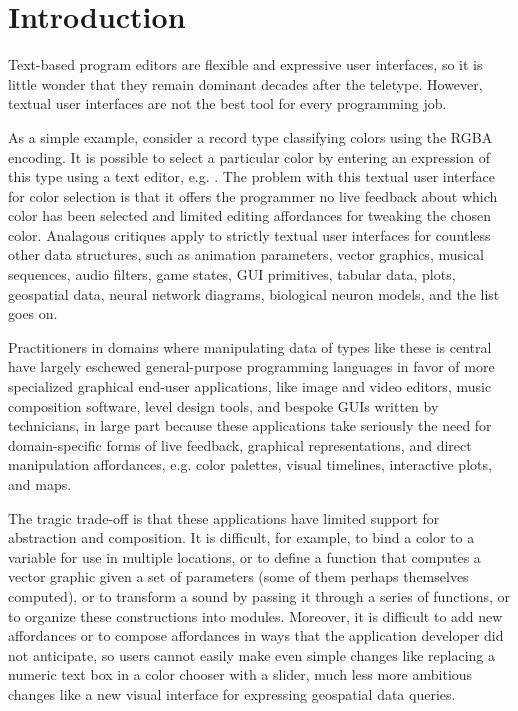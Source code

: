 \section{Introduction}\label{sec:intro}
Text-based program editors are flexible and expressive user interfaces,
so it is little wonder that they remain dominant decades after the teletype.
However, textual user interfaces are not the best tool for every programming job.

As a simple example, consider a record type
classifying colors using the RGBA encoding. 
It is possible to select a particular color by entering
an expression of this type using a text editor, e.g. . 
The problem with this textual user interface for color selection is that 
it offers the programmer no live feedback about which color has been selected 
and limited editing affordances for tweaking the chosen color.
Analagous critiques apply to strictly textual user interfaces for 
countless other data structures,
such as animation parameters,
vector graphics,
musical sequences,
audio filters,
game states, 
GUI primitives,
tabular data, 
plots,
geospatial data, 
neural network diagrams, 
biological neuron models, 
and the list goes on.


Practitioners in domains where manipulating data of types like these is central 
have largely eschewed general-purpose programming languages 
in favor of more specialized graphical end-user applications, like %
image and video editors, music composition software, level design tools, 
and bespoke GUIs written by technicians, 
in large part because these applications 
take seriously the need for domain-specific forms of live feedback, graphical representations, and
direct manipulation affordances, 
e.g. color palettes, visual timelines, interactive plots, and maps.

The tragic trade-off is that these applications have limited support for abstraction and composition.
It is difficult, for example, to bind a
color to a variable for use in multiple locations,
or to define a function that computes a vector graphic given a set
of parameters (some of them perhaps themselves computed),
or to transform a sound by passing it through a series of functions,
or to organize these constructions into modules.
Moreover, it is difficult to add new affordances or to compose
affordances in ways that the application developer did not anticipate,
so users cannot easily make even simple changes like replacing a numeric text box in a color chooser with a slider,
much less more ambitious changes like a new visual interface for expressing geospatial data queries.

